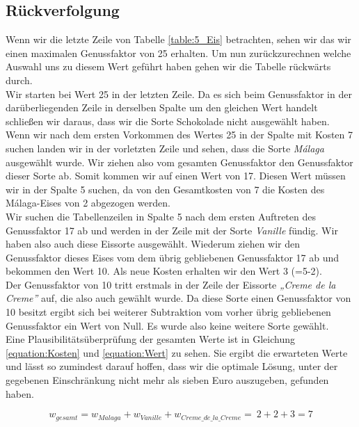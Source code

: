 \documentclass[a4paper, 12pt]{article}
\begin{document}
\subsection{Rückverfolgung}

Wenn wir die letzte Zeile von Tabelle \ref{table:5_Eis} betrachten, sehen wir das wir einen maximalen Genussfaktor von 25 erhalten. Um nun zurückzurechnen welche Auswahl uns zu diesem Wert geführt haben gehen wir die Tabelle rückwärts durch.\\

Wir starten bei Wert 25 in der letzten Zeile. Da es sich beim Genussfaktor in der darüberliegenden Zeile in derselben Spalte um den gleichen Wert handelt schließen wir daraus, dass wir die Sorte Schokolade nicht ausgewählt haben.\\

Wenn wir nach dem ersten Vorkommen des Wertes 25 in der Spalte mit Kosten 7 suchen landen wir in der vorletzten Zeile und sehen, dass die Sorte \emph{Málaga} ausgewählt wurde. Wir ziehen also vom gesamten Genussfaktor den Genussfaktor dieser Sorte ab. Somit kommen wir auf einen Wert von 17. Diesen Wert müssen wir in der Spalte 5 suchen, da von den Gesamtkosten von 7 die Kosten des Málaga-Eises von 2 abgezogen werden.\\

Wir suchen die Tabellenzeilen in Spalte 5 nach dem ersten Auftreten des Genussfaktor 17 ab und werden in der Zeile mit der Sorte \emph{Vanille} fündig. Wir haben also auch diese Eissorte ausgewählt. Wiederum ziehen wir den Genussfaktor dieses Eises vom dem übrig gebliebenen Genussfaktor 17 ab und bekommen den Wert 10. Als neue Kosten erhalten wir den Wert 3 (=5-2).\\

Der Genussfaktor von 10 tritt erstmals in der Zeile der Eissorte \emph{„Creme de la Creme”} auf, die also auch gewählt wurde. Da diese Sorte einen Genussfaktor von 10 besitzt ergibt sich bei weiterer Subtraktion vom vorher übrig gebliebenen Genussfaktor ein Wert von Null. Es wurde also keine weitere Sorte gewählt.\\

Eine Plausibilitätsüberprüfung der gesamten Werte ist in Gleichung \ref{equation:Kosten} und \ref{equation:Wert} zu sehen. Sie ergibt die erwarteten Werte und lässt so zumindest darauf hoffen, dass wir die optimale Lösung, unter der gegebenen Einschränkung nicht mehr als sieben Euro auszugeben, gefunden haben.

\begin{equation}
	\label{equation:Kosten}
	w_{gesamt} = w_{Malaga} + w_{Vanille} + w_{Creme\_de\_la\_Creme} = \
	2 + 2 + 3 = 7
\end{equation}
\end{document}

